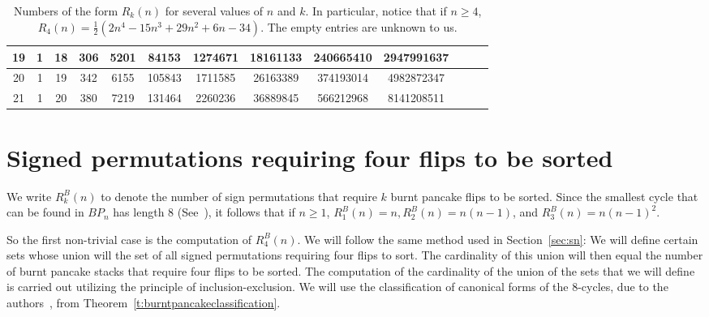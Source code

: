 \documentclass[final]{dmtcs-episciences}
\numberwithin{equation}{section}
\begin{document}
\begin{table}
{\begin{tabular}{|*{13}{c|}}
    \hline
    19 & 1 & 18 & 306 & 5201 & 84153 & 1274671 & 18161133 & 240665410 & 2947991637 &&&\\
    \hline
    20 & 1 & 19 & 342 & 6155 & 105843 & 1711585 & 26163389 &374193014 & 4982872347 &&&\\
    \hline
    21 & 1 & 20 & 380 & 7219 & 131464 & 2260236 & 36889845 &566212968 & 8141208511 &&&\\
    \hline
\end{tabular}
}
\caption{Numbers of the form $R_k(n)$ for several values of $n$ and $k$. In particular, notice that if $n\geq4$, $R_4(n)=\frac{1}{2} (2 n^4 - 15 n^3 + 29 n^2 + 6 n - 34)$. The empty entries are unknown to us.}
\label{tab:sn}
\end{table}

\section{Signed permutations requiring four flips to be sorted}\label{sec:bn}

We write $R_k^B(n)$ to denote the number of sign permutations that require $k$ burnt pancake flips to be sorted. Since the smallest cycle that can be found in $BP_n$ has length 8 (See~\cite{Compeau2011}), it follows that if $n\geq1$,
    $R_1^B(n)=n,R_2^B(n)=n(n-1)$, and $R_3^B(n)=n(n-1)^2.$
    
    So the first non-trivial case is the computation of $R_4^B(n)$. We will follow the same method used in Section~\ref{sec:sn}: We will define certain sets whose union will the set of all signed permutations requiring four flips to sort. The cardinality of this union will then equal the number of burnt pancake stacks that require four flips to be sorted. The computation of the cardinality of the union of the sets that we will define is carried out utilizing the principle of inclusion-exclusion. We will use the classification of canonical forms of the 8-cycles, due to the authors~\cite{BBP2018}, from Theorem~\ref{t:burntpancakeclassification}.
\end{document}
